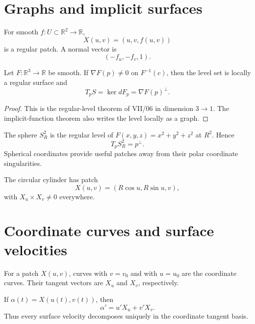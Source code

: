\section{Graphs and implicit surfaces}
\begin{proposition}\label{prop:vii14-graph}
For smooth \(f:U\subset\mathbb R^2\to\mathbb R\),
\[
X(u,v)=(u,v,f(u,v))
\]
is a regular patch.  A normal vector is
\[
(-f_u,-f_v,1).
\]
\end{proposition}

\begin{theorem}\label{thm:vii14-implicit}
Let \(F:\mathbb R^3\to\mathbb R\) be smooth.  If \(\nabla F(p)\neq0\) on \(F^{-1}(c)\), then the level set is locally a regular surface and
\[
T_pS=\ker dF_p=\nabla F(p)^\perp.
\]
\end{theorem}
\begin{proof}
This is the regular-level theorem of VII/06 in dimension \(3\to1\).  The implicit-function theorem also writes the level locally as a graph.
\end{proof}

\begin{example}[Sphere]\label{ex:vii14-sphere}
The sphere \(S_R^2\) is the regular level of \(F(x,y,z)=x^2+y^2+z^2\) at \(R^2\).  Hence
\[
T_pS_R^2=p^\perp.
\]
Spherical coordinates provide useful patches away from their polar coordinate singularities.
\end{example}

\begin{example}[Cylinder]\label{ex:vii14-cylinder}
The circular cylinder has patch
\[
X(u,v)=(R\cos u,R\sin u,v),
\]
with \(X_u\times X_v\neq0\) everywhere.
\end{example}

\section{Coordinate curves and surface velocities}
\begin{definition}\label{def:vii14-coordinate-curves}
For a patch \(X(u,v)\), curves with \(v=v_0\) and with \(u=u_0\) are the coordinate curves.  Their tangent vectors are \(X_u\) and \(X_v\), respectively.
\end{definition}

\begin{proposition}\label{prop:vii14-surface-velocity}
If \(\alpha(t)=X(u(t),v(t))\), then
\[
\alpha'=u'X_u+v'X_v.
\]
Thus every surface velocity decomposes uniquely in the coordinate tangent basis.
\end{proposition}

